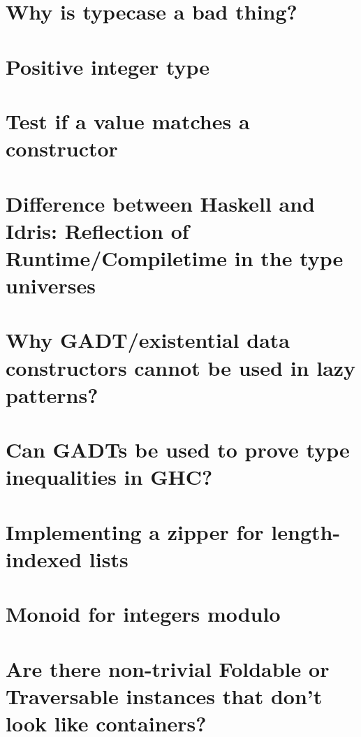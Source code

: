 \documentclass{book}
\begin{document}
\section{Why is typecase a bad thing?}


\section{Positive integer type}


\section{Test if a value matches a constructor}


\section{Difference between Haskell and Idris: Reflection of Runtime/Compiletime in the type universes}


\section{Why GADT/existential data constructors cannot be used in lazy patterns?}


\section{Can GADTs be used to prove type inequalities in GHC?}


\section{Implementing a zipper for length-indexed lists}


\section{Monoid for integers modulo}


\section{Are there non-trivial Foldable or Traversable instances that don't look like containers?}

\end{document}
